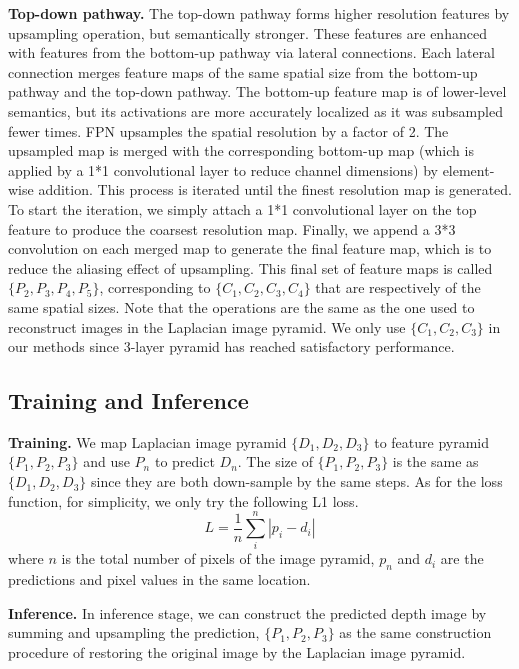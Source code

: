 \documentclass{article} %
\begin{document}
\textbf{Top-down pathway.} The top-down pathway forms higher resolution features by upsampling operation, but semantically stronger. These features are enhanced with features from the bottom-up pathway via lateral connections. Each lateral connection merges feature maps of the same spatial size from the bottom-up pathway and the top-down pathway. The bottom-up feature map is of lower-level semantics, but its activations are more accurately localized as it was subsampled fewer times. FPN upsamples the spatial resolution by a factor of 2. The upsampled map is merged with the corresponding bottom-up map (which is applied by a 1*1 convolutional layer to reduce channel dimensions) by element-wise addition. This process is iterated until the finest resolution map is generated. To start the iteration, we simply attach a 1*1 convolutional layer on the top feature to produce the coarsest resolution map. Finally, we append a 3*3 convolution on each merged map to generate the final feature map, which is to reduce the aliasing effect of upsampling. This final set of feature maps is called $\{P_2, P_3, P_4, P_5\}$, corresponding to $\{C_1, C_2, C_3, C_4\}$ that are respectively of the same spatial sizes. Note that the operations are the same as the one used to reconstruct images in the Laplacian image pyramid. We only use $\{C_1, C_2, C_3\}$ in our methods since 3-layer pyramid has reached satisfactory performance.

\subsection{Training and Inference}
\textbf{Training.} We map Laplacian image pyramid $\{D_1, D_2, D_3\}$ to feature pyramid $\{P_1, P_2, P_3\}$ and use $P_n$ to predict $D_n$. The size of $\{P_1, P_2, P_3\}$ is the same as $\{D_1, D_2, D_3\}$ since they are both down-sample by the same steps. As for the loss function, for simplicity, we only try the following L1 loss.
\begin{equation}
    L=\frac{1}{n}\sum_i^n |p_i-d_i|
\end{equation}
where $n$ is the total number of pixels of the image pyramid, $p_n$ and $d_i$ are the predictions and pixel values in the same location. 

\textbf{Inference.} In inference stage, we can construct the predicted depth image by summing and upsampling the prediction, $\{P_1,P_2,P_3\}$ as the same construction procedure of restoring the original image by the Laplacian image pyramid.
\end{document}
